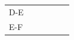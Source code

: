 {\begin{tabular}[t]{|l|l|l|l|l|l|}
     \tabularnewline\cline{1-1}\cline{2-2}\cline{3-3}\cline{4-4}\cline{5-5}\cline{6-6}
        D-E &
         &
         &
         &
         &
     \tabularnewline\cline{1-1}\cline{2-2}\cline{3-3}\cline{4-4}\cline{5-5}\cline{6-6}
        E-F &
         &
         &
         &
         &

\end{tabular}}
